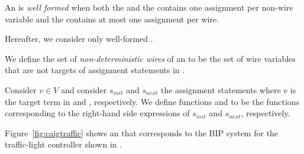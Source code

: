 \begin{definition}
An \caig is {\em well formed} when both 
the  and the 
contains one assignment per non-wire variable and
the  contains at most 
one assignment per wire. 
\end{definition}
%
Hereafter, we consider only well-formed \caig.


\begin{definition}
We define the set of {\em non-deterministic wires} of 
an \caig to be the set of wire variables that are not 
targets of assignment statements in .
\end{definition}



\begin{definition}
Consider $v\in V$ and consider $s_{init}$ and $s_{next}$ 
the assignment statements where $v$ is the target term in 
 and , respectively. 
We define functions  and  
to be the functions corresponding to the right-hand side 
expressions of $s_{init}$ and $s_{next}$, respectively. 
\end{definition}

\begin{example}
Figure~\ref{fig:caigtraffic} shows an \caig that corresponds to the BIP system for the traffic-light controller shown in . 

\end{example}

